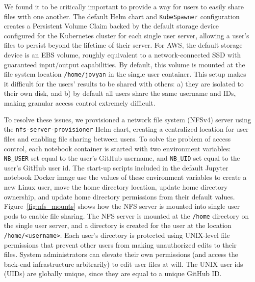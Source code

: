 \documentclass[twocolumn, linenumbers]{aastex631}
\begin{document}
We found it to be critically important to provide a way for users to easily share files with one another. The default Helm chart and \texttt{KubeSpawner} configuration creates a Persistent Volume Claim backed by the default storage device configured for the Kubernetes cluster for each single user server, allowing a user's files to persist beyond the lifetime of their server. For AWS, the default storage device is an EBS volume, roughly equivalent to a network-connected SSD with guaranteed input/output capabilities. By default, this volume is mounted at the file system location \texttt{/home/jovyan} in the single user container. This setup makes it difficult for the users' results to be shared with others: a) they are isolated to their own disk, and b) by default all users share the same username and IDs, making granular access control extremely difficult.

To resolve these issues, we provisioned a network file system (NFSv4) server using the \texttt{nfs-server-provisioner} Helm chart, creating a centralized location for user files and enabling file sharing between users. To solve the problem of access control, each notebook container is started with two environment variables: \texttt{NB\_USER} set equal to the user's GitHub username, and \texttt{NB\_UID} set equal to the user's GitHub user id. The start-up scripts included in the default Jupyter notebook Docker image use the values of these environment variables to create a new Linux user, move the home directory location, update home directory ownership, and update home directory permissions from their default values. Figure~\ref{fig:nfs_mounts} shows how the NFS server is mounted into single user pods to enable file sharing. The NFS server is mounted at the \texttt{/home} directory on the single user server, and a directory is created for the user at the location \texttt{/home/<username>}. Each user's directory is protected using UNIX-level file permissions that prevent other users from making unauthorized edits to their files. System administrators can elevate their own permissions (and access the back-end infrastructure arbitrarily) to edit user files at will. The UNIX user ids (UIDs) are globally unique, since they are equal to a unique GitHub ID.
\end{document}
